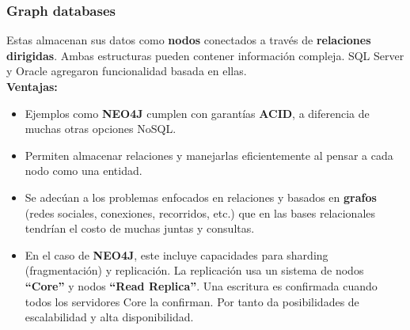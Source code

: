 \subsubsection*{Graph databases}
Estas almacenan sus datos como \textbf{nodos} conectados a través de \textbf{relaciones dirigidas}. Ambas estructuras pueden contener información compleja. SQL Server y Oracle agregaron funcionalidad basada en ellas. \\
\textbf{Ventajas:}\
\begin{itemize}
    \item Ejemplos como \textbf{NEO4J} cumplen con garantías \textbf{ACID}, a diferencia de muchas otras opciones NoSQL.
    \item Permiten almacenar relaciones y manejarlas eficientemente al pensar a cada nodo como una entidad.
    \item Se adecúan a los problemas enfocados en relaciones y basados en \textbf{grafos} (redes sociales, conexiones, recorridos, etc.) que en las bases relacionales tendrían el costo de muchas juntas y consultas.
    \item En el caso de \textbf{NEO4J}, este incluye capacidades para sharding (fragmentación) y replicación. La replicación usa un sistema de nodos \textbf{``Core''} y nodos \textbf{``Read Replica''}. Una escritura es confirmada cuando todos los servidores Core la confirman. Por tanto da posibilidades de escalabilidad y alta disponibilidad.
\end{itemize}